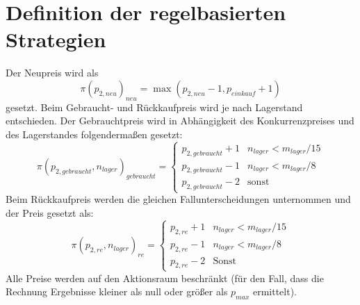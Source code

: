 \section{Definition der regelbasierten Strategien}
\label{section:rulebased_definition}
Der Neupreis wird als
\begin{equation}
	\pi\left(p_{2, neu}\right)_{neu} = \max{\left(p_{2, neu} - 1, p_{einkauf} + 1\right)}
\end{equation}
gesetzt.
Beim Gebraucht- und Rückkaufpreis wird je nach Lagerstand entschieden.
Der Gebrauchtpreis wird in Abhängigkeit des Konkurrenzpreises und des Lagerstandes folgendermaßen gesetzt:
\begin{equation}
	\pi\left(p_{2, gebraucht}, n_{lager}\right)_{gebraucht} =
	\begin{cases}
		p_{2, gebraucht} + 1 & n_{lager} < m_{lager} / 15\\
		p_{2, gebraucht} - 1 & n_{lager} < m_{lager} / 8\\
		p_{2, gebraucht} - 2 & \text{sonst}
	\end{cases}
\end{equation}
Beim Rückkaufpreis werden die gleichen Fallunterscheidungen unternommen und der Preis gesetzt als:
\begin{equation}
	\pi(p_{2, re}, n_{lager})_{re} =
	\begin{cases}
		p_{2, re} + 1 & n_{lager} < m_{lager} / 15\\
		p_{2, re} - 1 & n_{lager} < m_{lager} / 8\\
		p_{2, re} - 2 & \text{Sonst}
	\end{cases}
\end{equation}
Alle Preise werden auf den Aktionsraum beschränkt (für den Fall, dass die Rechnung Ergebnisse kleiner als null oder größer als $p_{max}$ ermittelt).

